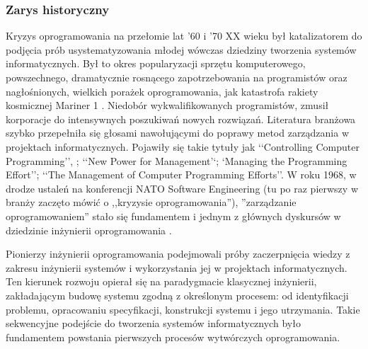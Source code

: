       \subsubsection{Zarys historyczny}

        Kryzys oprogramowania na przełomie lat '60 i '70 XX wieku był katalizatorem do podjęcia prób usystematyzowania młodej wówczas dziedziny tworzenia systemów informatycznych. Był to okres popularyzacji sprzętu komputerowego, powszechnego, dramatycznie rosnącego zapotrzebowania na programistów oraz nagłośnionych, wielkich porażek oprogramowania, jak katastrofa rakiety kosmicznej Mariner 1 \cite{Brooks75}. Niedobór wykwalifikowanych programistów, zmusił korporacje do intensywnych poszukiwań nowych rozwiązań. Literatura branżowa szybko przepełniła się głosami nawołującymi do poprawy metod zarządzania w projektach informatycznych. Pojawiły się takie tytuły jak ‘‘Controlling Computer Programming’’, ; ‘‘New Power for Management’‘; ‘Managing the Programming Effort’’; ‘‘The Management of Computer Programming Efforts’’. W roku 1968, w drodze ustaleń na konferencji NATO Software Engineering (tu po raz pierwszy w branży zaczęto mówić o ,,kryzysie oprogramowania''), ''zarządzanie oprogramowaniem'' stało się fundamentem i jednym z głównych dyskursów w dziedzinie inżynierii oprogramowania \cite{Ense03}.
        
        Pionierzy inżynierii oprogramowania podejmowali próby zaczerpnięcia wiedzy z zakresu inżynierii systemów i wykorzystania jej w projektach informatycznych. Ten kierunek rozwoju opierał się na paradygmacie klasycznej inżynierii, zakładającym budowę systemu zgodną z określonym procesem: od identyfikacji problemu, opracowaniu specyfikacji, konstrukcji systemu i jego utrzymania. Takie sekwencyjne podejście do tworzenia systemów informatycznych było fundamentem powstania pierwszych procesów wytwórczych oprogramowania. 
        
